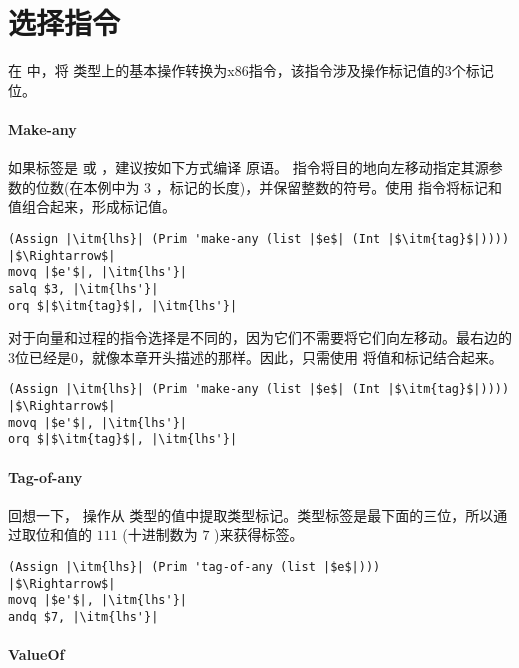 \documentclass[11pt]{book}
\begin{document}
\section{选择指令}
\label{sec:select-Rany}

在  中，将  类型上的基本操作转换为x86指令，该指令涉及操作标记值的3个标记位。

\paragraph{Make-any}

如果标签是  或  ，建议按如下方式编译  原语。  指令将目的地向左移动指定其源参数的位数(在本例中为 $3$ ，标记的长度)，并保留整数的符号。使用  指令将标记和值组合起来，形成标记值。  \\
\begin{lstlisting}
(Assign |\itm{lhs}| (Prim 'make-any (list |$e$| (Int |$\itm{tag}$|))))
|$\Rightarrow$|
movq |$e'$|, |\itm{lhs'}|
salq $3, |\itm{lhs'}|
orq $|$\itm{tag}$|, |\itm{lhs'}|
\end{lstlisting}
对于向量和过程的指令选择是不同的，因为它们不需要将它们向左移动。最右边的3位已经是0，就像本章开头描述的那样。因此，只需使用  将值和标记结合起来。 \\
\begin{lstlisting}
(Assign |\itm{lhs}| (Prim 'make-any (list |$e$| (Int |$\itm{tag}$|))))
|$\Rightarrow$|
movq |$e'$|, |\itm{lhs'}|
orq $|$\itm{tag}$|, |\itm{lhs'}|
\end{lstlisting}

\paragraph{Tag-of-any}

回想一下，  操作从  类型的值中提取类型标记。类型标签是最下面的三位，所以通过取位和值的 $111$
(十进制数为 $7$ )来获得标签。
\begin{lstlisting}
(Assign |\itm{lhs}| (Prim 'tag-of-any (list |$e$|)))
|$\Rightarrow$|
movq |$e'$|, |\itm{lhs'}|
andq $7, |\itm{lhs'}|
\end{lstlisting}

\paragraph{ValueOf}
\end{document}
